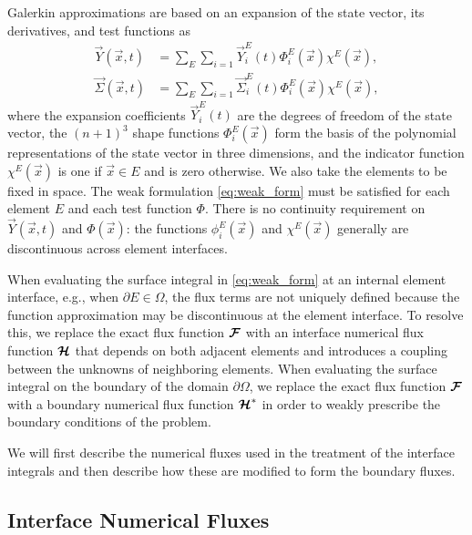 \documentclass{report}
\numberwithin{equation}{section}
\begin{document}
Galerkin approximations are based on an expansion of the state vector, its derivatives, and test functions as
\begin{align}
    \vec Y(\overrightarrow{x}, t) & = \sum_E \sum_{i=1} \vec Y_i^E(t) \Phi_i^E(\overrightarrow{x}) \chi^E(\overrightarrow{x}), \\
    \vec \Sigma(\overrightarrow{x}, t) & = \sum_E \sum_{i=1} \vec \Sigma^E_i(t) \Phi^E_i(\overrightarrow{x}) \chi^E(\overrightarrow{x}) ,
\end{align}
where the expansion coefficients $\vec Y_i^E(t)$ are the degrees of freedom of the state vector, the $(n+1)^3$ shape functions $\Phi_i^E(\overrightarrow{x})$ form the basis of the polynomial representations of the state vector in three dimensions, and the indicator function $\chi^E(\overrightarrow{x})$ is one if $\overrightarrow{x} \in E$ and is zero otherwise. We also take the elements to be fixed in space.
The weak formulation \eqref{eq:weak_form} must be satisfied for each element $E$ and each test function $\Phi$. There is no continuity requirement on $\vec Y(\overrightarrow{x},t)$ and $\Phi(\overrightarrow{x})$: the functions $\phi_i^E(\overrightarrow{x})$ and $\chi^E(\overrightarrow{x})$ generally are discontinuous across element interfaces.

When evaluating the surface integral in \eqref{eq:weak_form} at an internal element interface, e.g., when $\partial E \in \Omega$, the flux terms are not uniquely defined because the function approximation may be discontinuous at the element interface. To resolve this, we replace the exact flux function $\boldsymbol{{\mathcal{F}}}$ with an interface numerical flux function $\boldsymbol{{\mathcal{H}}}$ that depends on both adjacent elements and introduces a coupling between the unknowns of neighboring elements. When evaluating the surface integral on the boundary of the domain $\partial \Omega$, we replace the exact flux function $\boldsymbol{{\mathcal{F}}}$ with a boundary numerical flux function $\boldsymbol{{\mathcal{H}}}^*$ in order to weakly prescribe the boundary conditions of the problem. 

We will first describe the numerical fluxes used in the treatment of the interface integrals and then describe how these are modified to form the boundary fluxes.

\subsection{Interface Numerical Fluxes}
\end{document}
